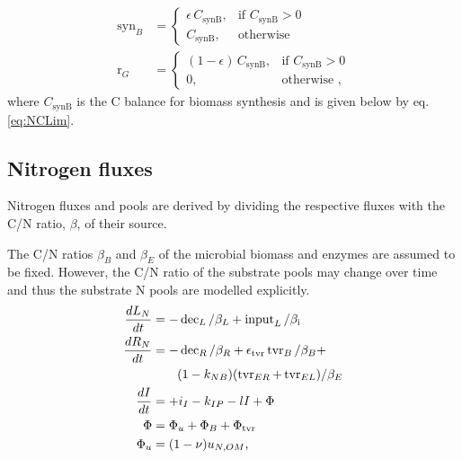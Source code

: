 \begin{subequations}
\label{eq:synB}
\begin{align}
\operatorname{syn}_B &= \begin{cases}
  \epsilon \, C_{\operatorname{synB}},  & \text{if~} C_{\operatorname{synB}} >
  0\\
  C_{\operatorname{synB}}, & \text{otherwise}
\end{cases} \\  
\operatorname{r}_G &= \begin{cases}
  (1 - \epsilon) \, C_{\operatorname{synB}},  & \text{if~}
  C_{\operatorname{synB}} > 0\\
  0, & \text{otherwise ,}
\end{cases}  
\end{align}
\end{subequations}
where $C_{\operatorname{synB}}$ is the C balance for biomass
synthesis and is given below by eq.
\ref{eq:NCLim}.



\subsection{Nitrogen fluxes}
Nitrogen fluxes and pools are derived by dividing the respective fluxes with the
C/N ratio, $\beta$, of their source.

The C/N ratios $\beta_B$ and $\beta_E$ of the microbial biomass and 
enzymes are assumed to be fixed. However, the C/N ratio of the substrate pools
may change over time and thus the substrate N pools are modelled explicitly.
\begin{subequations}
\label{eq:SEAMN}
\begin{align}
\frac{dL_N}{dt} &=  - \operatorname{dec}_L /\beta_{L} +
\operatorname{input}_L/\beta_{\operatorname{i}} 
\\
\frac{dR_N}{dt} &=  - \operatorname{dec}_R /\beta_{R} +
\epsilon_{\operatorname{tvr}} \operatorname{tvr}_B /\beta_{B} + \notag 
\\
& \qquad (1 -k_{NB}) (\operatorname{tvr}_{ER} +
\operatorname{tvr}_{EL})/\beta_{E} 
\\
\frac{dI}{dt} &= +i_I -k_{IP} -l I +\Phi
\\
\Phi &= \Phi_u +\Phi_B + \Phi_{\operatorname{tvr}}
\\
\Phi_u &= (1 -\nu) u_{N,OM}
\text{,} 
\end{align}
\end{subequations}

